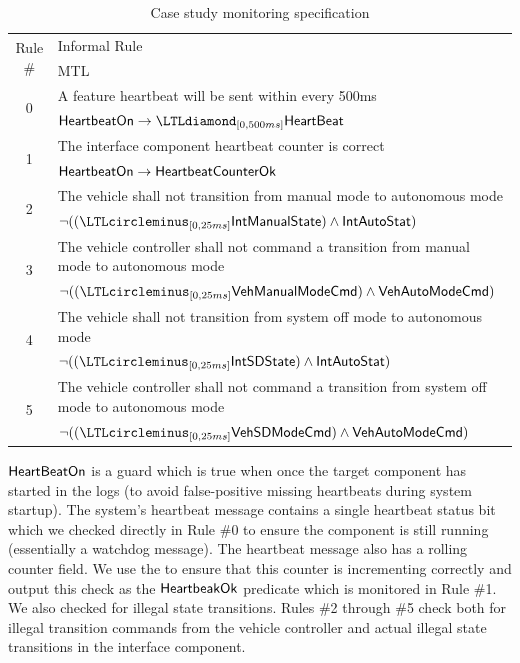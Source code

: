 \begin{table}[htbp]
\centering
\footnotesize
\begin{tabular}{|c|p{4.5in}|}
\hline \multirow{2}{*}{Rule \#} & Informal Rule \\ & MTL \\
\hline \multirow{2}{*}{0} & A feature heartbeat will be sent within every 500ms \\
& $\pred{HeartbeatOn} \rightarrow \LTLdiamond_{[0,500ms]} \pred{HeartBeat}$ \\
\hline \multirow{2}{*}{1} & The interface component heartbeat counter is correct \\
& $\mathsf{HeartbeatOn} \rightarrow \mathsf{HeartbeatCounterOk}$ \\
\hline \multirow{2}{*}{2} & The vehicle shall not transition from manual mode to autonomous mode \\
&  $\neg ((\LTLcircleminus_{[0,25ms]} \pred{IntManualState}) \wedge \pred{IntAutoStat})$\\
\hline \multirow{2}{*}{3} & The vehicle controller shall not command a transition from manual mode to autonomous mode \\
& $\neg ((\LTLcircleminus_{[0,25ms]} \pred{VehManualModeCmd}) \wedge \pred{VehAutoModeCmd})$\\
\hline \multirow{2}{*}{4} & The vehicle shall not transition from system off mode to autonomous mode \\
&  $\neg ((\LTLcircleminus_{[0,25ms]} \pred{IntSDState}) \wedge \pred{IntAutoStat})$\\
\hline \multirow{2}{*}{5} & The vehicle controller shall not command a transition from system off mode to autonomous mode \\
& $\neg ((\LTLcircleminus_{[0,25ms]} \pred{VehSDModeCmd}) \wedge \pred{VehAutoModeCmd})$\\
\hline
\end{tabular}
\caption{Case study monitoring specification \label{tab:monspec}}
\end{table}

$\mathsf{HeartBeatOn}$ is a guard which is true when once the target component has started in the logs (to avoid false-positive missing heartbeats during system startup). 
The system's heartbeat message contains a single heartbeat status bit which we checked directly in Rule \#0 to ensure the component is still running (essentially a watchdog message). 
The heartbeat message also has a rolling counter field. 
We use the \sfmap to ensure that this counter is incrementing correctly and output this check as the $\mathsf{HeartbeakOk}$ predicate which is monitored in Rule \#1.
We also checked for illegal state transitions. Rules \#2 through \#5 check both for illegal transition commands from the vehicle controller and actual illegal state transitions in the interface component.

